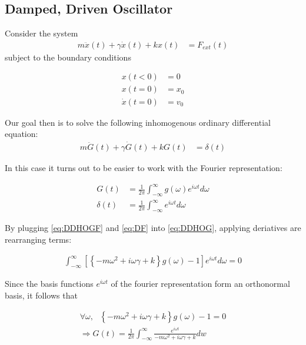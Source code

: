 \documentclass[11pt]{article}
\theoremstyle{plain}
\theoremstyle{definition}
\begin{document}
\subsection{Damped, Driven  Oscillator}

Consider the system
\begin{align}
    m \ddot x(t) + \gamma \dot x(t) + kx(t) &= F_{ext}(t) \label{eq:DDHO}
\end{align}
subject to the boundary conditions

\begin{align}
    x(t < 0) &= 0 \\
    x(t=0) &= x_0 \label{eq:X0}\\
    \dot x(t = 0) &= v_0 \label{eq:V0}
\end{align}

Our goal then is to solve the following inhomogenous ordinary differential equation:
\begin{align}
    m \ddot G(t) + \gamma \dot G(t) + kG(t) &= \delta(t) \label{eq:DDHOG}
\end{align}


In this case it turns out to be easier to work with the Fourier representation:

\begin{align}
    G(t) &= \frac{1}{2\pi} \int_{-\infty}^{\infty} g(\omega) e^{i\omega t} d\omega \label{eq:DDHOGF} \\
    \delta(t) &= \frac{1}{2\pi} \int_{-\infty}^{\infty} e^{i\omega t} d\omega \label{eq:DF}
\end{align}

By plugging \eqref{eq:DDHOGF} and \eqref{eq:DF} into \eqref{eq:DDHOG}, applying deriatives are rearranging terms:

\begin{align}
    \int_{-\infty}^{\infty} \left[ \left\{ -m\omega^2 + i\omega \gamma + k \right\}g(\omega) - 1 \right] e^{i\omega t} d\omega = 0
\end{align}

Since the basis functions $e^{i\omega t}$ of the fourier representation form an orthonormal basis, it follows that

\begin{align}
    \forall \omega, \ \ \ \left\{ -m\omega^2 + i\omega \gamma + k \right\}g(\omega) - 1 = 0 \\
    \Rightarrow G(t) = \frac{1}{2\pi} \int_{-\infty}^{\infty} \frac{e^{i\omega t}}{-m\omega^2 + i\omega \gamma + k} dw
\end{align}
\end{document}
